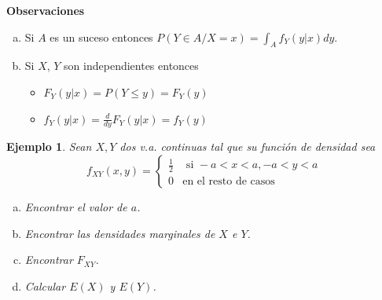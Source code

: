 \documentclass[12pt]{report}
\newtheorem{example}[definition]{Ejemplo}
\begin{document}
    \textbf{Observaciones}
\begin{enumerate}[a)]
    \item Si $A$ es un suceso entonces
    $P(Y\in A/X=x)=\int_{A}f_{Y}(y|x) dy$.

   \item Si $X$, $Y$ son independientes entonces
\begin{itemize}
    \item $F_{Y}(y|x)=P(Y\leq y)=F_{Y}(y)$

   \item $f_{Y}(y|x)=\frac{d}{dy} F_{Y}(y|x)=f_{Y}(y)$
\end{itemize}
\end{enumerate}

      \begin{example}
      Sean $X, Y$ dos v.a. continuas tal que su función de densidad sea
      $$f_{XY}(x,y)=\left\{\begin{array}{ll}
      \frac{1}{2} & \mbox{ si } -a<x<a, -a<y<a\\
      0 & \mbox{en el resto de casos}
      \end{array}\right.$$

      \begin{enumerate}[a)]
          \item Encontrar el valor de $a$.
          \item Encontrar las densidades marginales de $X$ e $Y$.
          \item Encontrar $F_{X Y}$.
          \item Calcular $E(X)$ y $E(Y)$.
          \end{enumerate}
         \end{example}
\end{document}
